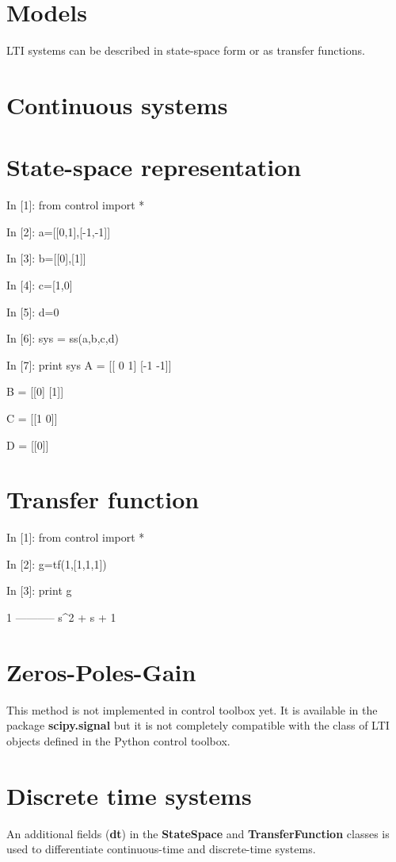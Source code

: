 \section{Models}

LTI systems can be described in state-space form or as transfer functions.

\section{Continuous systems}
\section{State-space representation}
\begin{code}
In [1]: from control import *

In [2]: a=[[0,1],[-1,-1]]

In [3]: b=[[0],[1]]

In [4]: c=[1,0]

In [5]: d=0

In [6]: sys = ss(a,b,c,d)

In [7]: print sys
A = [[ 0  1]
 [-1 -1]]

B = [[0]
 [1]]

C = [[1 0]]

D = [[0]]
\end{code}

 
\section{Transfer function}

\begin{code}
 In [1]: from control import *

In [2]: g=tf(1,[1,1,1])

In [3]: print g

     1
-----------
s^2 + s + 1
\end{code}


\section{Zeros-Poles-Gain}
This method is not implemented in control toolbox yet. It is available in the 
package \textbf{scipy.signal} but it is not completely compatible with the 
class of LTI objects defined in the Python control toolbox.

\section{Discrete time systems}
An additional fields (\textbf{dt}) in the \textbf{StateSpace} and 
\textbf{TransferFunction} classes is used to differentiate continuous-time and 
discrete-time systems.

